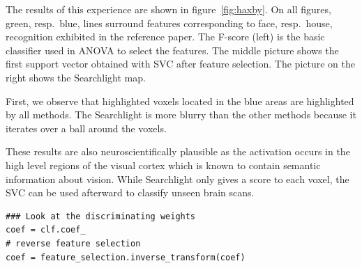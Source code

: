\documentclass{frontiersSCNS} %
\begin{document}
The results of this experience are shown in figure~\ref{fig:haxby}.
On all figures, green, resp.\ blue,
lines surround features corresponding to face, resp.\ house, recognition
exhibited in the reference paper.
The F-score (left) is the basic
classifier used in ANOVA to select the features. The middle picture shows the
first support vector obtained with SVC after feature selection. The picture on
the right shows the Searchlight map.

First, we observe that highlighted voxels located in the blue areas are
highlighted by all methods. The Searchlight is more blurry than the other
methods because it iterates over a ball around the voxels.

These results are also neuroscientifically plausible as the activation occurs in the
high level regions of the visual cortex which is known to contain semantic
information about vision. While Searchlight only gives a score to each voxel,
the SVC can be used afterward to classify unseen brain scans.

\begin{lstlisting}
### Look at the discriminating weights
coef = clf.coef_
# reverse feature selection
coef = feature_selection.inverse_transform(coef)
\end{lstlisting}
\end{document}
